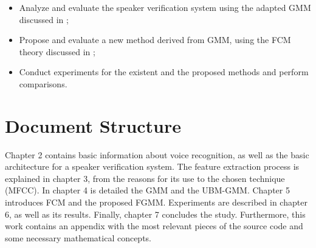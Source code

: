 \begin{itemize}\itemsep0pt
    \item Analyze and evaluate the speaker verification system using the adapted GMM discussed in \autocite{reynolds.quatieri.dunn.2000};
    \item Propose and evaluate a new method derived from GMM, using the FCM theory discussed in \autocite{gao.zhou.pu.2013};
    \item Conduct experiments for the existent and the proposed methods and perform comparisons.
\end{itemize}

\section{Document Structure}

Chapter 2 contains basic information about voice recognition, as well as the basic architecture for a speaker verification system. The feature extraction process is explained in chapter 3, from the reasons for its use to the chosen technique (MFCC). In chapter 4 is detailed the GMM and the UBM-GMM. Chapter 5 introduces FCM and the proposed FGMM. Experiments are described in chapter 6, as well as its results. Finally, chapter 7 concludes the study. Furthermore, this work contains an appendix with the most relevant pieces of the source code and some necessary mathematical concepts.